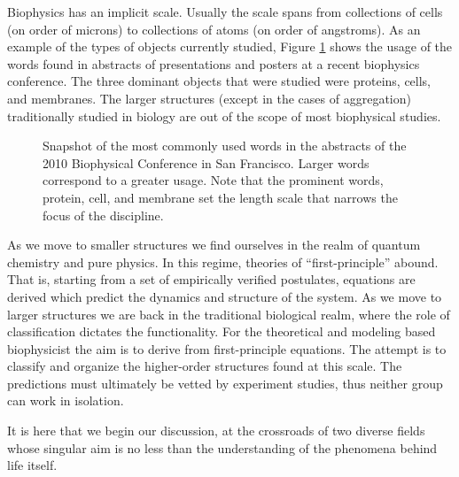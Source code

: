 Biophysics has an implicit scale. Usually the scale spans from collections of cells (on order of microns) to collections of atoms (on order of angstroms). As an example of the types of objects currently studied, Figure \ref{fig:conf_words} shows the usage of the words found in abstracts of presentations and posters at a recent biophysics conference. The three dominant objects that were studied were proteins, cells, and membranes. The larger structures (except in the cases of aggregation) traditionally studied in biology are out of the scope of most biophysical studies. 
%
\begin{figure}
  \begin{centering}
    \caption{Snapshot of the most commonly used words in the abstracts of the 2010 Biophysical Conference in San Francisco.\cite{BPS_conf_2010} Larger words correspond to a greater usage. Note that the prominent words, protein, cell, and membrane set the length scale that narrows the focus of the discipline.}
    \label{fig:conf_words}
  \end{centering}
\end{figure}

As we move to smaller structures we find ourselves in the realm of quantum chemistry and pure physics. In this regime, theories of ``first-principle'' abound. That is, starting from a set of empirically verified postulates, equations are derived which predict the dynamics and structure of the system. As we move to larger structures we are back in the traditional biological realm, where the role of classification dictates the functionality. 
For the theoretical and modeling based biophysicist the aim is to derive from first-principle equations. The attempt is to classify and organize the higher-order structures found at this scale. The predictions must ultimately be vetted by experiment studies, thus neither group can work in isolation.

It is here that we begin our discussion, at the crossroads of two diverse fields whose singular aim is no less than the understanding of the phenomena behind life itself.

